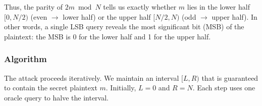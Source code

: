 Thus, the parity of \(2m \bmod N\) tells us exactly whether \(m\) lies in the lower half \([0, N/2)\) (even $\rightarrow$ lower half) or the upper half \([N/2, N)\) (odd $\rightarrow$ upper half). In other words, a single LSB query reveals the most significant bit (MSB) of the plaintext: the MSB is 0 for the lower half and 1 for the upper half.


\subsubsection*{Algorithm}

The attack proceeds iteratively. We maintain an interval \([L, R)\) that is guaranteed to contain the secret plaintext \(m\). Initially, \(L = 0\) and \(R = N\). Each step uses one oracle query to halve the interval.

